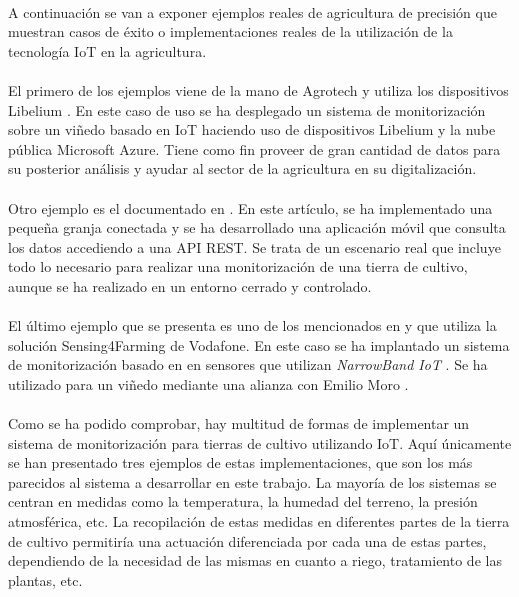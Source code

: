 \documentclass[../../memoria.tex]{subfiles}
\begin{document}
\paragraph{}
A continuación se van a exponer ejemplos reales de agricultura de precisión que muestran casos de éxito o implementaciones reales de la utilización de la tecnología IoT en la agricultura.

\paragraph{}
El primero de los ejemplos viene de la mano de Agrotech y utiliza los dispositivos Libelium \cite{libeliumusecase1}. En este caso de uso se ha desplegado un sistema de monitorización sobre un viñedo basado en IoT haciendo uso de dispositivos Libelium y la nube pública Microsoft Azure. Tiene como fin proveer de gran cantidad de datos para su posterior análisis y ayudar al sector de la agricultura en su digitalización.

\paragraph{}
Otro ejemplo es el documentado en \cite{inproceedings}. En este artículo, se ha implementado una pequeña granja conectada y se ha desarrollado una aplicación móvil que consulta los datos accediendo a una API REST. Se trata de un escenario real que incluye todo lo necesario para realizar una monitorización de una tierra de cultivo, aunque se ha realizado en un entorno cerrado y controlado.

\paragraph{}
El último ejemplo que se presenta es uno de los mencionados en \cite{vodafones} y que utiliza la solución Sensing4Farming de Vodafone. En este caso se ha implantado un sistema de monitorización basado en en sensores que utilizan \textit{NarrowBand IoT} \cite{narrowband}. Se ha utilizado para un viñedo mediante una alianza con Emilio Moro \cite{emiliomoro}.

\paragraph{}
Como se ha podido comprobar, hay multitud de formas de implementar un sistema de monitorización para tierras de cultivo utilizando IoT. Aquí únicamente se han presentado tres ejemplos de estas implementaciones, que son los más parecidos al sistema a desarrollar en este trabajo. La mayoría de los sistemas se centran en medidas como la temperatura, la humedad del terreno, la presión atmosférica, etc. La recopilación de estas medidas en diferentes partes de la tierra de cultivo permitiría una actuación diferenciada por cada una de estas partes, dependiendo de la necesidad de las mismas en cuanto a riego, tratamiento de las plantas, etc.
\end{document}

